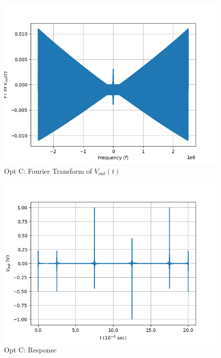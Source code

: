 \documentclass[journal,12pt,twocolumn]{IEEEtran}
\theoremstyle{remark}
\begin{document}
\begin{figure}[!h]
    \centering
    \includegraphics[width = \columnwidth]{figs/opt_c_ft.png}
    \caption{Opt C: Fourier Transform of $V_{out}(t)$}
    \label{fig:c_ft_gate.ph.23.37}
\end{figure}
\begin{figure}[!h]
    \centering
    \includegraphics[width = \columnwidth]{figs/opt_c_res.png}
    \caption{Opt C: Response}
    \label{fig:c_res_gate.ph.23.37}
\end{figure}
\end{document}
